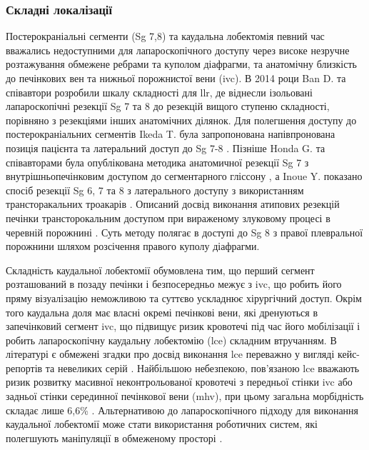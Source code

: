 \begin{refsection}
\subsubsection{Складні локалізації}

Постерокраніальні сегменти (Sg 7,8) та каудальна лобектомія певний час вважались недоступними для лапароскопічного доступу через високе незручне розтажування обмежене ребрами та куполом діафрагми, та анатомічну близкість до печінкових вен та нижньої порожнистої вени (\acrshort{ivc}). В 2014 роци Ban D. та співавтори розробили шкалу складності для \acrshort{llr}, де віднесли ізольовані лапароскопічні резекції Sg 7 та 8 до резекцій вищого ступеню складності, порівняно з резекціями інших анатомічних ділянок. Для полегшення доступу до постерокраніальних сегментів Ikeda T. була запропонована напівпронована позиція пацієнта та латеральний доступ до Sg 7-8 \cite{Ikeda2014}. Пізніше Honda G. та співавторами була опублікована методика анатомичної резекції Sg 7 з внутрішньопечінковим доступом до сегментарного  гліссону \cite{Okuda2017}, а Inoue Y. показано спосіб резекції Sg 6, 7 та 8 з латерального доступу з використанням трансторакальних троакарів \cite{Inoue2017}. Описаний досвід виконання атипових резекцій печінки трансторокальним доступом при вираженому злуковому процесі в черевній порожнині \cite{Kruger2014}. Суть методу полягає в доступі до Sg 8 з правої плевральної порожнини шляхом розсічення правого куполу діафрагми.

Складність каудальної лобектомії обумовлена тим, що перший сегмент розташований в позаду печінки і безпосередньо межує з \acrshort{ivc}, що робить його пряму візуалізацію неможливою та суттєво ускладнює хірургічний доступ. Окрім того каудальна доля має власні окремі печінкові вени, які дренуються в запечінковий сегмент \acrshort{ivc}, що підвищує ризик кровотечі під час його мобілізації і робить лапароскопічну каудальну лобектомію (\acrshort{lce}) складним втручанням. В літературі є обмежені згадки про досвід виконання \acrshort{lce} переважно у вигляді кейс-репортів та невеликих серій \cite{Machado2018, Cheung2016, Koh2017, Jin2018}. Найбільшою небезпекою, пов'язаною \acrshort{lce} вважають ризик розвитку масивної неконтрольованої кровотечі з передньої стінки \acrshort{ivc} або задньої стінки серединної печінкової вени (\acrshort{mhv}), при цьому загальна морбідність складає лише 6,6\% \cite{Araki2018}. Альтернативою до лапароскопічного підходу для виконання каудальної лобектомії може стати використання роботичних систем, які полегшують маніпуляції в обмеженому просторі \cite{Marino2018a}.


\end{refsection}
